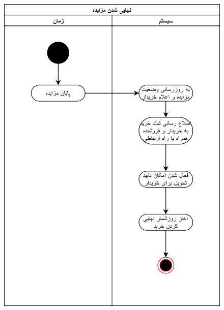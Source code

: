 \documentclass{article}
\begin{document}
\begin{figure}[htp]
\includegraphics[width = 1\textwidth]{../Activity Diagrams/Activity 3.png}
\caption{}
\label{activity3}
\end{figure}
\end{document}
